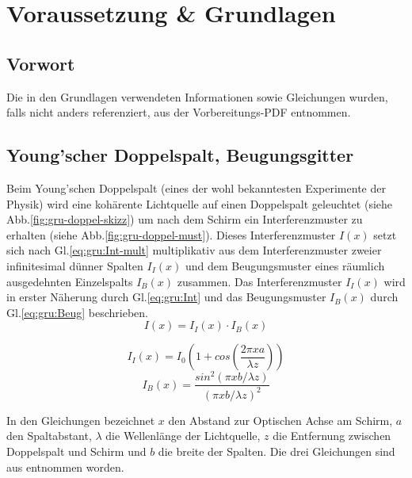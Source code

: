 \section{Voraussetzung \& Grundlagen}
\label{sec:voraussetzungen-grundlagen}
\subsection*{Vorwort}
Die in den Grundlagen verwendeten Informationen sowie Gleichungen wurden, falls nicht anders referenziert, aus der Vorbereitungs-PDF \cite{LAB} entnommen.

\subsection{Young'scher Doppelspalt, Beugungsgitter}
Beim Young'schen Doppelspalt (eines der wohl bekanntesten Experimente der Physik) wird eine kohärente Lichtquelle auf einen Doppelspalt geleuchtet (siehe Abb.\ref{fig:gru-doppel-skizz}) um nach dem Schirm ein Interferenzmuster zu erhalten (siehe Abb.\ref{fig:gru-doppel-must}).
Dieses Interferenzmuster $I(x)$ setzt sich nach Gl.\ref{eq:gru:Int-mult} multiplikativ aus dem Interferenzmuster zweier infinitesimal dünner Spalten $I_{I}(x)$ und dem Beugungsmuster eines räumlich ausgedehnten Einzelspalts $I_{B}(x)$ zusammen.
Das Interferenzmuster $I_{I}(x)$ wird in erster Näherung durch Gl.\ref{eq:gru:Int} und das Beugungsmuster $I_{B}(x)$ durch Gl.\ref{eq:gru:Beug} beschrieben.
\begin{equation}
    I(x) = I_{I}(x) \cdot I_{B}(x)
    \label{eq:gru:Int-mult}
\end{equation}
\begin{multicols}{2}
    \begin{equation}
        I_{I}(x) = I_0 \left(1 + cos\left(\frac{2\pi x a}{\lambda z}\right)\right)
        \label{eq:gru:Int}
    \end{equation}\break
    \begin{equation}
        I_{B}(x) = \frac{sin^2\left(\pi x b / \lambda z \right)}{\left(\pi x b / \lambda z \right)^2}
        \label{eq:gru:Beug}
    \end{equation}
\end{multicols}
In den Gleichungen bezeichnet $x$ den Abstand zur Optischen Achse am Schirm, $a$ den Spaltabstant, $\lambda$ die Wellenlänge der Lichtquelle, $z$ die Entfernung zwischen Doppelspalt und Schirm und $b$ die breite der Spalten.
Die drei Gleichungen sind aus \cite{LAB} entnommen worden.


